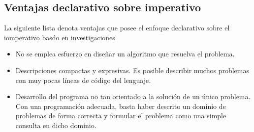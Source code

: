 \subsection{Ventajas declarativo sobre imperativo}
La siguiente lista denota ventajas que posee el enfoque declarativo sobre el iomperativo basdo en investigaciones \cite{Dec10}
\begin{itemize}
\item No se emplea esfuerzo en diseñar un algoritmo que resuelva el problema.
\item Descripciones compactas y expresivas. Es posible describir muchos problemas con muy pocas líneas de código del lenguaje.
\item Desarrollo del programa no tan orientado a la solución de un único problema. Con una programación adecuada, basta haber descrito un dominio de problemas de forma correcta y formular el problema como una simple consulta en dicho dominio.
\end{itemize}